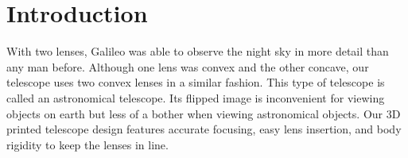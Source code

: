 \section{Introduction}
\label{sec:Introduction}
With two lenses, Galileo was able to observe the night sky in more detail than any man before. Although one lens was convex and the other concave, our telescope uses two convex lenses in a similar fashion. This type of telescope is called an astronomical telescope. Its flipped image is inconvenient for viewing objects on earth but less of a bother when viewing astronomical objects. Our 3D printed telescope design features accurate focusing, easy lens insertion, and body rigidity to keep the lenses in line.


